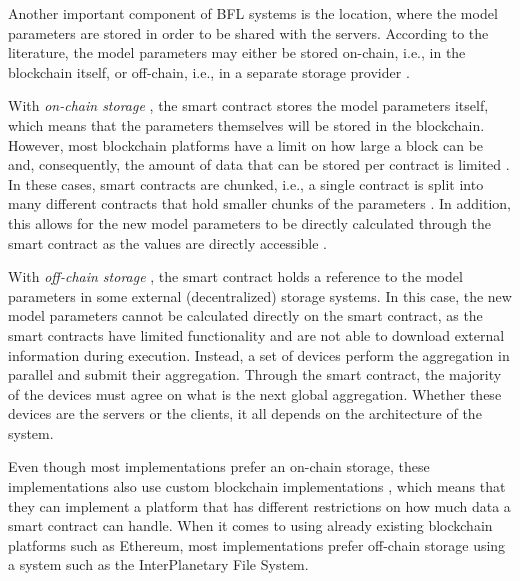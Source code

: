 Another important component of BFL systems is the location, where the model parameters are stored in order to be shared with the servers. According to the literature, the model parameters may either be stored on-chain, i.e., in the blockchain itself, or off-chain, i.e., in a separate storage provider \cite{10.48550/arxiv.2104.10501}.

With \textit{on-chain storage} \cite{9274451, baffle, demo, 8733825, 9524833, 8894364, 9184854, 8893114}, the smart contract stores the model parameters itself, which means that the parameters themselves will be stored in the blockchain. However, most blockchain platforms have a limit on how large a block can be and, consequently, the amount of data that can be stored per contract is limited \cite{9274451}. In these cases, smart contracts are chunked, i.e., a single contract is split into many different contracts that hold smaller chunks of the parameters \cite{baffle}. In addition, this allows for the new model parameters to be directly calculated through the smart contract as the values are directly accessible  \cite{9274451}.
    
With \textit{off-chain storage} \cite{10.1145/3319535.3363256, 10.48550/arxiv.2011.07516, 8945913, 10.48550/arxiv.2202.02817, 10.48550/arxiv.2007.03856, 10.48550/arxiv.1910.12603, Peyvandi2022, 9170559}, the smart contract holds a reference to the model parameters in some external (decentralized) storage systems. In this case, the new model parameters cannot be calculated directly on the smart contract, as the smart contracts have limited functionality and are not able to download external information during execution. Instead, a set of devices perform the aggregation in parallel and submit their aggregation. Through the smart contract, the majority of the devices must agree on what is the next global aggregation. Whether these devices are the servers or the clients, it all depends on the architecture of the system.

Even though most implementations prefer an on-chain storage, these implementations also use custom blockchain implementations \cite{8733825, 9524833, 8894364, 9184854, 8893114}, which means that they can implement a platform that has different restrictions on how much data a smart contract can handle. When it comes to using already existing blockchain platforms such as Ethereum, most implementations prefer off-chain storage using a system such as the InterPlanetary File System\cite{10.48550/arxiv.2007.03856, 8945913, Peyvandi2022, 9170559, 10.1145/3319535.3363256, 10.48550/arxiv.2011.07516}.


